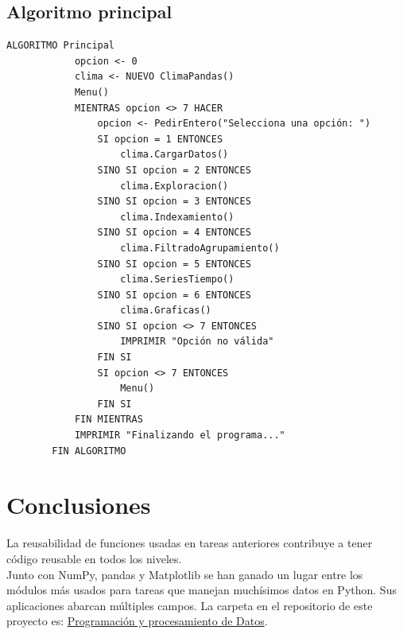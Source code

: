 \documentclass{assignment}
\begin{document}
	\subsection*{Algoritmo principal}
	\begin{lstlisting}[caption={Algoritmo principal}, label={lst:principal}]
		ALGORITMO Principal
			opcion <- 0
			clima <- NUEVO ClimaPandas()
			Menu()
			MIENTRAS opcion <> 7 HACER
				opcion <- PedirEntero("Selecciona una opción: ")
				SI opcion = 1 ENTONCES		
					clima.CargarDatos()
				SINO SI opcion = 2 ENTONCES
					clima.Exploracion()
				SINO SI opcion = 3 ENTONCES
					clima.Indexamiento()
				SINO SI opcion = 4 ENTONCES
					clima.FiltradoAgrupamiento()
				SINO SI opcion = 5 ENTONCES
					clima.SeriesTiempo()
				SINO SI opcion = 6 ENTONCES
					clima.Graficas()
				SINO SI opcion <> 7 ENTONCES
					IMPRIMIR "Opción no válida"
				FIN SI
				SI opcion <> 7 ENTONCES
					Menu()
				FIN SI
			FIN MIENTRAS
			IMPRIMIR "Finalizando el programa..."
		FIN ALGORITMO
	\end{lstlisting}
	
	\section*{Conclusiones}
	La reusabilidad de funciones usadas en tareas anteriores contribuye a tener código reusable en todos los niveles.\\
	Junto con NumPy, pandas y Matplotlib se han ganado un lugar entre los módulos más usados para tareas que manejan muchísimos datos en Python. Sus aplicaciones abarcan múltiples campos.
	La carpeta en el repositorio de este proyecto es: \href{https://github.com/clivan/Programacion_y_Procesamiento_de_Datos_Infotec/3A}{Programación y procesamiento de Datos}.	
\end{document}
